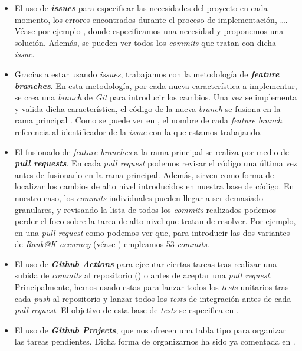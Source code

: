 \begin{itemize}
	\item El uso de \textbf{\textit{issues}} para especificar las necesidades del proyecto en cada momento, los errores encontrados durante el proceso de implementación, \ldots. Véase por ejemplo \cite{informatica:ejemplo_issue_14}, donde especificamos una necesidad y proponemos una solución. Además, se pueden ver todos los \textit{commits} que tratan con dicha \textit{issue}.
	\item Gracias a estar usando \textit{issues}, trabajamos con la metodología de \textbf{\textit{feature branches}}. En esta metodología, por cada nueva característica a implementar, se crea una \textit{branch} de \textit{Git} para introducir los cambios. Una vez se implementa y valida dicha característica, el código de la nueva \textit{branch} se fusiona en la rama principal \cite{informatica:feature_branches}. Como se puede ver en \cite{informatica:repogithub}, el nombre de cada \textit{feature branch} referencia al identificador de la \textit{issue} con la que estamos trabajando.
	\item El fusionado de \textit{feature branches} a la rama principal se realiza por medio de \textbf{\textit{pull requests}}. En cada \textit{pull request} podemos revisar el código una última vez antes de fusionarlo en la rama principal. Además, sirven como forma de localizar los cambios de alto nivel introducidos en nuestra base de código. En nuestro caso, los \textit{commits} individuales pueden llegar a ser demasiado granulares, y revisando la lista de todos los \textit{commits} realizados podemos perder el foco sobre la tarea de alto nivel que tratan de resolver. Por ejemplo, en una \textit{pull request} como \cite{informatica:ejemplo_pr_57} podemos ver que, para introducir las dos variantes de \textit{Rank@K accuracy} (véase ) empleamos 53 \textit{commits}.
	\item El uso de \textbf{\textit{Github Actions}} para ejecutar ciertas tareas tras realizar una subida de \textit{commits} al repositorio () o antes de aceptar una \textit{pull request}. Principalmente, hemos usado estas  para lanzar todos los \textit{tests} unitarios tras cada \textit{push} al repositorio y lanzar todos los \textit{tests} de integración antes de cada \textit{pull request}. El objetivo de esta base de \textit{tests} se especifica en .
	\item El uso de \textbf{\textit{Github Projects}}, que nos ofrecen una tabla tipo  para organizar las tareas pendientes. Dicha forma de organizarnos ha sido ya comentada en .
\end{itemize}


